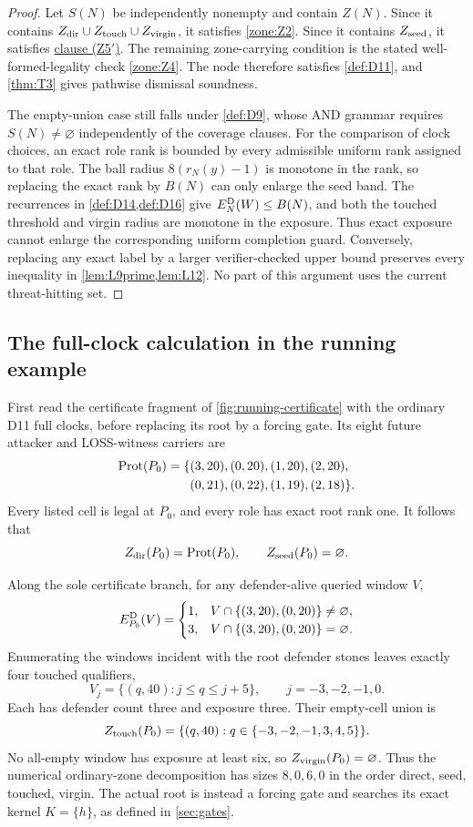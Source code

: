 \begin{proof}
Let $S(N)$ be independently nonempty and contain $Z(N)$.  Since it contains
$Z_{\mathrm{dir}}\cup Z_{\mathrm{touch}}\cup Z_{\mathrm{virgin}}$, it satisfies \cref{zone:Z2}.  Since it
contains $Z_{\mathrm{seed}}$, it satisfies
\hyperref[zone:Z5prime]{clause \textup{(Z5$'$)}}.  The remaining zone-carrying
condition is the stated well-formed-legality check \cref{zone:Z4}.  The node
therefore satisfies \cref{def:D11}, and \cref{thm:T3} gives pathwise
dismissal soundness.

The empty-union case still falls under \cref{def:D9}, whose AND grammar
requires $S(N)\ne\varnothing$ independently of the coverage clauses.  For
the comparison of clock choices, an exact role rank is bounded by every
admissible uniform rank assigned to that role.  The ball radius
$8(r_N(y)-1)$ is monotone in the rank, so replacing the exact rank by $B(N)$
can only enlarge the seed band.  The recurrences in \cref{def:D14,def:D16}
give $E_N^{\mathrm{D}}(W)\le B(N)$, and both the touched threshold and virgin radius are
monotone in the exposure.  Thus exact exposure cannot enlarge the
corresponding uniform completion guard.  Conversely, replacing any exact
label by a larger verifier-checked upper bound preserves every inequality in
\cref{lem:L9prime,lem:L12}.  No part of this argument uses the current
threat-hitting set.
\end{proof}

\subsection{The full-clock calculation in the running example}
\label{ex:running-zone-computation}

First read the certificate fragment of \cref{fig:running-certificate} with the
ordinary D11 full clocks, before replacing its root by a forcing gate.  Its
eight future attacker and LOSS-witness carriers are
\[
 \begin{split}
 \operatorname{Prot}(P_0)=\{&(3,20),(0,20),(1,20),(2,20),\\
              &(0,21),(0,22),(1,19),(2,18)\}.
 \end{split}
\]
Every listed cell is legal at $P_0$, and every role has exact root rank one.
It follows that
\[
 Z_{\mathrm{dir}}(P_0)=\operatorname{Prot}(P_0),\qquad Z_{\mathrm{seed}}(P_0)=\varnothing.
\]

Along the sole certificate branch, for any defender-alive queried window $V$,
\[
 E_{P_0}^{\mathrm{D}}(V)=
 \begin{cases}
  1,&V\cap\{(3,20),(0,20)\}\ne\varnothing,\\
  3,&V\cap\{(3,20),(0,20)\}=\varnothing.
 \end{cases}
\]
Enumerating the windows incident with the root defender stones leaves exactly
four touched qualifiers,
\[
 V_j=\{(q,40):j\le q\le j+5\},\qquad j=-3,-2,-1,0.
\]
Each has defender count three and exposure three.  Their empty-cell union is
\[
 Z_{\mathrm{touch}}(P_0)=
 \{(q,40):q\in\{-3,-2,-1,3,4,5\}\}.
\]
No all-empty window has exposure at least six, so
$Z_{\mathrm{virgin}}(P_0)=\varnothing$.  Thus the numerical ordinary-zone decomposition
has sizes $8,0,6,0$ in the order direct, seed, touched, virgin.  The actual
root is instead a forcing gate and searches its exact kernel $K=\{h\}$, as
defined in \cref{sec:gates}.

